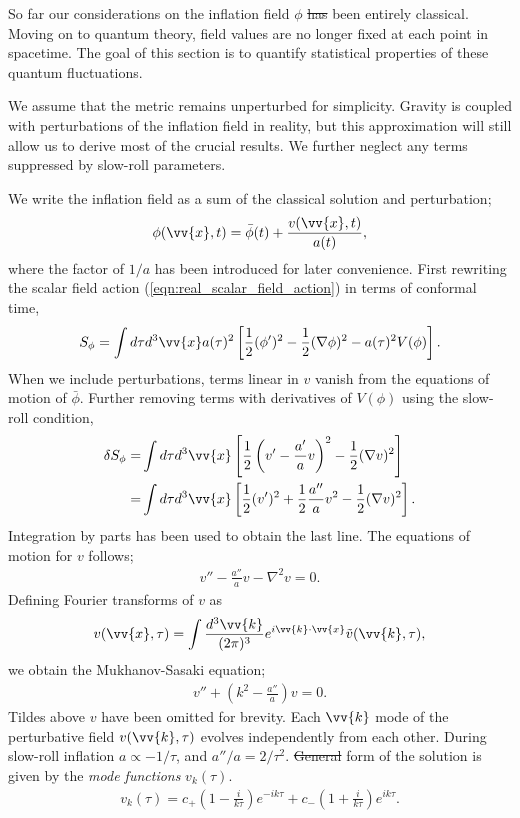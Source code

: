 \documentclass[a4paper,12pt,times,custombib,print,index]{Classes/PhDThesisPSnPDF} %
\providecommand{\DIFadd}[1]{{\protect\color{blue}\uwave{#1}}} %
\providecommand{\DIFdel}[1]{{\protect\color{red}\sout{#1}}}                      %
\providecommand{\DIFaddbegin}{} %
\providecommand{\DIFaddend}{} %
\providecommand{\DIFdelbegin}{} %
\providecommand{\DIFdelend}{} %
\newcommand{\DIFscaledelfig}{0.5}
\newlength{\DIFdelgraphicswidth} %
\newlength{\DIFdelgraphicsheight} %
\newcommand{\DIFaddincludegraphics}[2][]{{\color{blue}\fbox{\DIFOincludegraphics[#1]{#2}}}} %
\newcommand{\DIFdelincludegraphics}[2][]{%
\sbox{\DIFdelgraphicsbox}{\DIFOincludegraphics[#1]{#2}}%
\settoboxwidth{\DIFdelgraphicswidth}{\DIFdelgraphicsbox} %
\settoboxtotalheight{\DIFdelgraphicsheight}{\DIFdelgraphicsbox} %
\scalebox{\DIFscaledelfig}{%
\parbox[b]{\DIFdelgraphicswidth}{\usebox{\DIFdelgraphicsbox}\\[-\baselineskip] \rule{\DIFdelgraphicswidth}{0em}}\llap{\resizebox{\DIFdelgraphicswidth}{\DIFdelgraphicsheight}{%
\setlength{\unitlength}{\DIFdelgraphicswidth}%
\begin{picture}(1,1)%
\thicklines\linethickness{2pt} %
{\color[rgb]{1,0,0}\put(0,0){\framebox(1,1){}}}%
{\color[rgb]{1,0,0}\put(0,0){\line( 1,1){1}}}%
{\color[rgb]{1,0,0}\put(0,1){\line(1,-1){1}}}%
\end{picture}%
}\hspace*{3pt}}} %
} %
\DeclareRobustCommand{\DIFaddbegin}{\DIFOaddbegin \let\includegraphics\DIFaddincludegraphics} %
\DeclareRobustCommand{\DIFaddend}{\DIFOaddend \let\includegraphics\DIFOincludegraphics} %
\DeclareRobustCommand{\DIFdelbegin}{\DIFOdelbegin \let\includegraphics\DIFdelincludegraphics} %
\DeclareRobustCommand{\DIFdelend}{\DIFOaddend \let\includegraphics\DIFOincludegraphics} %
\begin{document}
So far our considerations on the inflation field $\phi$ \DIFdelbegin \DIFdel{has }\DIFdelend \DIFaddbegin \DIFadd{have }\DIFaddend been entirely classical. Moving on to quantum theory, field values are no longer fixed at each point in spacetime. The goal of this section is to quantify \DIFaddbegin \DIFadd{the }\DIFaddend statistical properties of these quantum fluctuations.

We assume that the metric remains unperturbed for simplicity. Gravity is coupled with perturbations of the inflation field in reality, but this approximation will still allow us to derive most of the crucial results. We further neglect any terms suppressed by slow-roll parameters.

We write the inflation field as a sum of the classical solution and perturbation;
\begin{align}
	\phi(\vv{x}, t) = \bar{\phi}(t) + \frac{v(\vv{x}, t)}{a(t)},	\label{eqn:inflation_perturbation_definition}
\end{align}
where the factor of $1/a$ has been introduced for later convenience. First rewriting the scalar field action (\ref{eqn:real_scalar_field_action}) in terms of conformal time,
\begin{align}
	S_\phi = \int d\tau d^3\vv{x} a(\tau)^2 \left[ \frac{1}{2} (\phi')^2 - \frac{1}{2}(\nabla\phi)^2 - a(\tau)^2 V(\phi) \right].
\end{align}
When we include perturbations, terms linear in $v$ vanish from the equations of motion of $\bar\phi$. Further removing terms with derivatives of $V(\phi)$ using the slow-roll condition,
\begin{align}
	\delta S_\phi =& \int d\tau d^3\vv{x} \left[ \frac{1}{2} \left(v' - \frac{a'}{a}v \right)^2 - \frac{1}{2}(\nabla v)^2 \right]	\\
	=& \int d\tau d^3\vv{x} \left[ \frac{1}{2} (v')^2 + \frac{1}{2}\frac{a''}{a} v^2 - \frac{1}{2}(\nabla v)^2 \right].
\end{align}
Integration by parts has been used to obtain the last line. The equations of motion for $v$ follows;
\begin{align}
	v'' - \frac{a''}{a} v - \nabla^2 v = 0.
\end{align}
Defining Fourier transforms of $v$ as
\begin{align}
	v(\vv{x},\tau) = \int \frac{d^3 \vv{k}}{(2\pi)^3} e^{i\vv{k} \cdot \vv{x}} \tilde{v}(\vv{k},\tau),
\end{align}
we obtain the Mukhanov-Sasaki equation;
\begin{align}
	v'' + (k^2 - \frac{a''}{a})v = 0.	\label{eqn:Mukhanov_Sasaki}
\end{align}
Tildes above $v$ have been omitted for brevity. Each $\vv{k}$ mode of the perturbative field $v(\vv{k},\tau)$ evolves independently from each other. During slow-roll inflation $a\propto-1/\tau$, and $a''/a = 2/\tau^2$. \DIFdelbegin \DIFdel{General }\DIFdelend \DIFaddbegin \DIFadd{The general }\DIFaddend form of the solution is given by the \textit{mode functions} $v_k(\tau)$.
\begin{align}
	v_k(\tau) = c_+ \left( 1 - \frac{i}{k\tau} \right) e^{-ik\tau} + c_- \left( 1 + \frac{i}{k\tau} \right) e^{ik\tau}.
\end{align}
\end{document}
